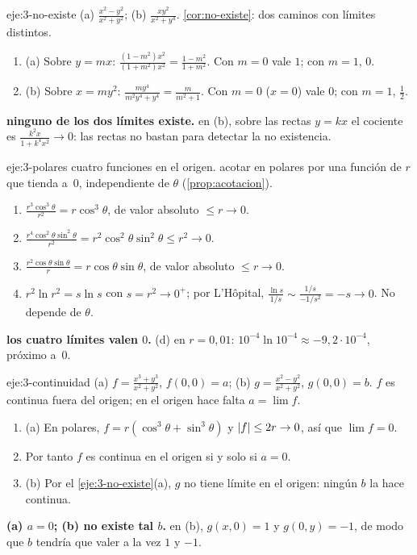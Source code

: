 \begin{solucion}{eje:3-no-existe}
\datos (a) $\frac{x^2-y^2}{x^2+y^2}$; (b) $\frac{xy^2}{x^2+y^4}$.
\planteamiento \cref{cor:no-existe}: dos caminos con límites distintos.
\pasos
\begin{enumerate}[label=\arabic*.]
  \item (a) Sobre $y=mx$: $\frac{(1-m^2)x^2}{(1+m^2)x^2}=\frac{1-m^2}{1+m^2}$. Con $m=0$ vale $1$; con $m=1$, $0$.
  \item (b) Sobre $x=my^2$: $\frac{my^4}{m^2y^4+y^4}=\frac{m}{m^2+1}$. Con $m=0$ ($x=0$) vale $0$; con $m=1$, $\frac12$.
\end{enumerate}
\resultado \textbf{ninguno de los dos límites existe.}
\comprobacion en (b), sobre las rectas $y=kx$ el cociente es $\frac{k^2x}{1+k^4x^2}\to0$: las rectas no bastan para detectar la no existencia.
\end{solucion}

\begin{solucion}{eje:3-polares}
\datos cuatro funciones en el origen.
\planteamiento acotar en polares por una función de $r$ que tienda a~0, independiente de $\theta$ (\cref{prop:acotacion}).
\pasos
\begin{enumerate}[label=(\alph*)]
  \item $\frac{r^3\cos^3\theta}{r^2}=r\cos^3\theta$, de valor absoluto $\le r\to0$.
  \item $\frac{r^4\cos^2\theta\sin^2\theta}{r^2}=r^2\cos^2\theta\sin^2\theta\le r^2\to0$.
  \item $\frac{r^2\cos\theta\sin\theta}{r}=r\cos\theta\sin\theta$, de valor absoluto $\le r\to0$.
  \item $r^2\ln r^2=s\ln s$ con $s=r^2\to0^+$; por L'Hôpital, $\frac{\ln s}{1/s}\sim\frac{1/s}{-1/s^2}=-s\to0$. No depende de $\theta$.
\end{enumerate}
\resultado \textbf{los cuatro límites valen $0$.}
\comprobacion (d) en $r=0{,}01$: $10^{-4}\ln10^{-4}\approx-9{,}2\cdot10^{-4}$, próximo a~0.
\end{solucion}

\begin{solucion}{eje:3-continuidad}
\datos (a) $f=\frac{x^3+y^3}{x^2+y^2}$, $f(0,0)=a$; (b) $g=\frac{x^2-y^2}{x^2+y^2}$, $g(0,0)=b$.
\planteamiento $f$ es continua fuera del origen; en el origen hace falta $a=\lim f$.
\pasos
\begin{enumerate}[label=\arabic*.]
  \item (a) En polares, $f=r(\cos^3\theta+\sin^3\theta)$ y $\lvert f\rvert\le2r\to0$, así que $\lim f=0$.
  \item Por tanto $f$ es continua en el origen si y solo si $a=0$.
  \item (b) Por el \cref{eje:3-no-existe}(a), $g$ no tiene límite en el origen: ningún $b$ la hace continua.
\end{enumerate}
\resultado \textbf{(a) $a=0$; (b) no existe tal $b$.}
\comprobacion en (b), $g(x,0)=1$ y $g(0,y)=-1$, de modo que $b$ tendría que valer a la vez $1$ y $-1$.
\end{solucion}

